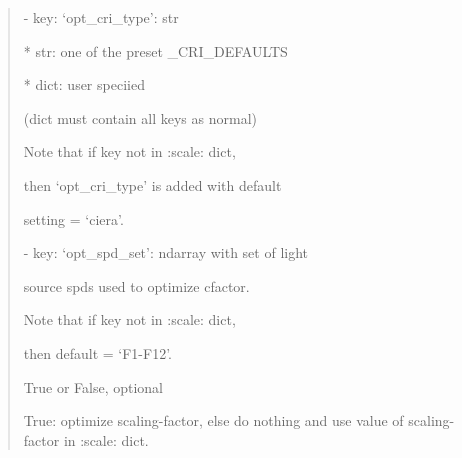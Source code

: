 \documentclass[letterpaper,10pt,english]{sphinxmanual}
\begin{document}
\begin{fulllineitems}
\begin{description}
\begin{quote}
\begin{description}
\begin{DUlineblock}{0em}
\begin{DUlineblock}{\DUlineblockindent}
\begin{DUlineblock}{\DUlineblockindent}
\begin{DUlineblock}{\DUlineblockindent}
\begin{DUlineblock}{\DUlineblockindent}
\begin{DUlineblock}{\DUlineblockindent}
\begin{DUlineblock}{\DUlineblockindent}
\item[] 
\end{DUlineblock}
\item[] - key: ‘opt\_cri\_type’:  str 
\item[]
\begin{DUlineblock}{\DUlineblockindent}
\item[]
\begin{DUlineblock}{\DUlineblockindent}
\item[] * str: one of the preset \_CRI\_DEFAULTS
\item[] * dict: user speciied 
\item[] (dict must contain all keys as normal)
\end{DUlineblock}
\item[] Note that if key not in :scale: dict, 
\item[] then ‘opt\_cri\_type’ is added with default 
\item[] setting = ‘ciera’.
\end{DUlineblock}
\end{DUlineblock}
\item[] - key: ‘opt\_spd\_set’: ndarray with set of light 
\item[]
\begin{DUlineblock}{\DUlineblockindent}
\item[] source spds used to optimize cfactor. 
\item[] Note that if key not in :scale: dict, 
\item[] then default = ‘F1-F12’.
\end{DUlineblock}
\end{DUlineblock}
\end{DUlineblock}
\end{DUlineblock}
\end{DUlineblock}
\end{DUlineblock}

\item[{opt\_scale}] \leavevmode
\begin{DUlineblock}{0em}
\item[] True or False, optional
\item[] True: optimize scaling-factor, else do nothing and use value of 
scaling-factor in :scale: dict.   
\end{DUlineblock}

\end{description}\end{quote}


\end{description}
\end{fulllineitems}
\end{document}
